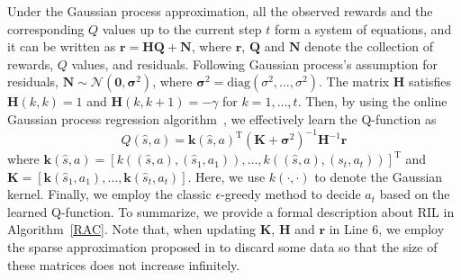 \documentclass{article}
\begin{document}
Under the Gaussian process approximation, all the observed rewards and the corresponding $Q$ values up to the current step $t$ form a system of equations, and it can be written as
$\bm{r}=\bm{H}\bm{Q}+\bm{N}$, where $\bm{r}$, $\bm{Q}$ and $\bm{N}$ denote the collection of rewards, $Q$ values, and residuals. Following Gaussian process's assumption for residuals, $\bm{N}\sim \mathcal{N}(\bm{0},\bm{\sigma}^2)$, where $\bm{\sigma}^2=\textrm{diag}(\sigma^2,\ldots,\sigma^2)$.
The matrix $\bm{H}$ satisfies $\bm{H}(k,k)=1$ and $\bm{H}(k,k+1)=-\gamma$ for $k=1,\ldots, t$.
Then, by using the online Gaussian process regression algorithm~\cite{engel2005reinforcement}, we effectively learn the Q-function as
\begin{equation}
\label{equation:update}
Q(\hat{s},a) = \bm{k}(\hat{s},a) ^{\mathrm{T}}(\bm{K} +\bm{\sigma}^2)^{-1}\bm{H}^{-1}\bm{r}
\end{equation}
where $\bm{k}(\hat{s},a)=[k((\hat{s},a), (\hat{s}_1,a_1)),\ldots, k((\hat{s},a), (s_t,a_t))]^{\mathrm{T}}$ and $\bm{K}=[\bm{k}(\hat{s}_1,a_1),\ldots,\bm{k}(\hat{s}_t,a_t)]$. Here, we use $k(\cdot, \cdot)$ to denote the Gaussian kernel.
Finally, we employ the classic $\epsilon$-greedy method to decide $a_t$ based on the learned Q-function.
To summarize, we provide a formal description about RIL in Algorithm~\ref{RAC}. Note that, when updating $\bm{K}$, $\bm{H}$ and $\bm{r}$ in Line 6, we employ the sparse approximation proposed in \cite{gasic2014gaussian} to discard some data so that the size of these matrices does not increase infinitely.






%
%
\end{document}
